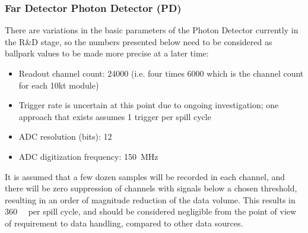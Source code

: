 



\subsubsection{Far Detector Photon Detector (PD)}
There are variations in the basic parameters of the Photon Detector
currently in the R\&D stage, so the numbers presented below need to be
considered as ballpark values to be made more precise at a later time:

\begin{itemize}
\item Readout channel count: \num{24000} (i.e. four times \num{6000} which is the channel count for each 10kt module)
\item Trigger rate is uncertain at this point due to ongoing investigation; one approach that exists assumes 1 trigger per spill cycle
\item ADC resolution (bits): 12
\item ADC digitization frequency: \SI{150}{\MHz}
\end{itemize}
It is assumed that a few dozen samples will be recorded in each
channel, and there will be zero suppression of channels with signals
below a chosen threshold, resulting in an order of magnitude reduction
of the data volume.  This results in \SI{360}{\kilo\byte} per spill cycle, and should
be considered negligible from the point of view of requirement to data
handling, compared to other data sources.

